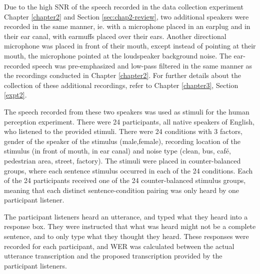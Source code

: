 Due to the high SNR of the speech recorded in the data collection experiment \DIFdelbegin {}\DIFdelend \DIFaddbegin {}\DIFaddend Chapter \ref{chapter2} and Section \ref{sec:chap2-review}\DIFdelbegin {}\DIFdelend \DIFaddbegin \DIFadd{)}\DIFaddend , two additional speakers were recorded in the same manner, ie. with a microphone placed in an earplug and in their ear canal, \DIFaddbegin {}\DIFaddend with earmuffs placed over their ears.  Another directional microphone was placed in front of their mouth, except instead of pointing at their mouth, the microphone pointed at the loudspeaker \DIFdelbegin {}\DIFdelend \DIFaddbegin {}\DIFaddend background noise. The ear-recorded speech was pre-emphasized and low-pass filtered in the same manner as the recordings conducted in Chapter \ref{chapter2}. For further details about the collection of these additional recordings, refer to Chapter \ref{chapter3}, Section \ref{expt2}.

The speech recorded from these two speakers was used as stimuli for the human perception experiment.  There were 24 participants, all native speakers of English, who listened to the provided stimuli.  There were 24 conditions with 3 factors, gender of the speaker of the stimulus (male,female), recording location of the stimulus (in front of mouth, in ear canal) and noise type (clean, bus, caf\'{e}, pedestrian area, street, factory).  The stimuli were placed in counter-balanced groups, where each sentence stimulus occurred in each of the 24 conditions.  Each of the 24 participants received one of the 24 counter-balanced stimulus groups, meaning that each distinct sentence-condition pairing was only heard by one participant listener.

The participant listeners heard an utterance, and typed what they heard into a response box.  They were instructed that what was heard might not be a complete sentence, and to only type what they thought they heard.  These responses were recorded for each participant, and WER was calculated between the actual utterance transcription and the proposed transcription provided by the participant listeners.

